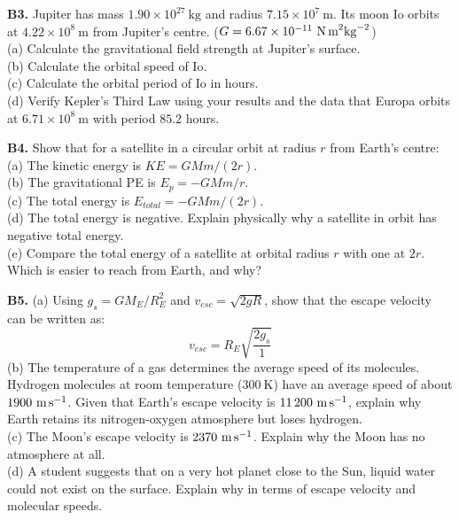 \begin{exercisebox}[8]
\vspace{0.4cm}

\textbf{B3.} Jupiter has mass $1.90\times10^{27}\ \text{kg}$
and radius $7.15\times10^7\ \text{m}$.
Its moon Io orbits at $4.22\times10^8\ \text{m}$ from
Jupiter's centre.
($G = 6.67\times10^{-11}\ \text{N\,m}^2\text{kg}^{-2}$)\\[4pt]
(a) Calculate the gravitational field strength at
Jupiter's surface.\\
(b) Calculate the orbital speed of Io.\\
(c) Calculate the orbital period of Io in hours.\\
(d) Verify Kepler's Third Law using your results and
the data that Europa orbits at $6.71\times10^8\ \text{m}$
with period $85.2$ hours.
\hfill{}

\vspace{0.4cm}

\textbf{B4.} Show that for a satellite in a circular
orbit at radius $r$ from Earth's centre:\\[4pt]
(a) The kinetic energy is $KE = GMm/(2r)$.\\
(b) The gravitational PE is $E_p = -GMm/r$.\\
(c) The total energy is $E_{total} = -GMm/(2r)$.\\
(d) The total energy is negative. Explain physically
why a satellite in orbit has negative total energy.\\
(e) Compare the total energy of a satellite at orbital
radius $r$ with one at $2r$. Which is easier to
reach from Earth, and why?
\hfill{}

\vspace{0.4cm}

\textbf{B5.} (a) Using $g_s = GM_E/R_E^2$ and
$v_{esc} = \sqrt{2gR}$, show that the escape
velocity can be written as:
\[
  v_{esc} = R_E\sqrt{\frac{2g_s}{1}}
\]
(b) The temperature of a gas determines the average
speed of its molecules. Hydrogen molecules at room
temperature ($300\ \text{K}$) have an average speed
of about $1900\ \text{m\,s}^{-1}$.
Given that Earth's escape velocity is
$11\,200\ \text{m\,s}^{-1}$, explain why Earth retains
its nitrogen-oxygen atmosphere but loses hydrogen.\\
(c) The Moon's escape velocity is
$2370\ \text{m\,s}^{-1}$. Explain why the Moon
has no atmosphere at all.\\
(d) A student suggests that on a very hot planet
close to the Sun, liquid water could not exist on
the surface. Explain why in terms of escape velocity
and molecular speeds.
\hfill{}

\end{exercisebox}

